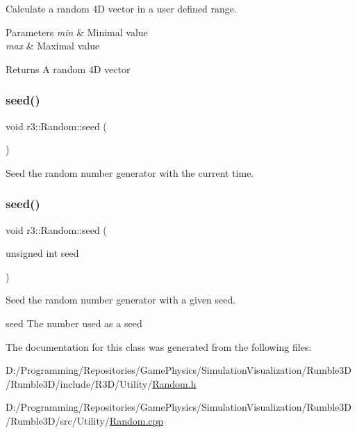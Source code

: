 Calculate a random 4D vector in a user defined range. 


\begin{DoxyParams}{Parameters}
{\em min} & Minimal value \\
\hline
{\em max} & Maximal value \\
\hline
\end{DoxyParams}
\begin{DoxyReturn}{Returns}
A random 4D vector 
\end{DoxyReturn}
\mbox{\label{classr3_1_1_random_afa6a47432ea2058f6424618bf77494f2}} 
\subsubsection{\texorpdfstring{seed()}{seed()}\hspace{0.1cm}{\footnotesize\ttfamily [1/2]}}
{\footnotesize\ttfamily void r3\+::\+Random\+::seed (\begin{DoxyParamCaption}{ }\end{DoxyParamCaption})\hspace{0.3cm}{\ttfamily [static]}}



Seed the random number generator with the current time. 

\mbox{\label{classr3_1_1_random_a5fbe1e0d20952af9374f024a24735d80}} 
\subsubsection{\texorpdfstring{seed()}{seed()}\hspace{0.1cm}{\footnotesize\ttfamily [2/2]}}
{\footnotesize\ttfamily void r3\+::\+Random\+::seed (\begin{DoxyParamCaption}\item[{unsigned int}]{seed }\end{DoxyParamCaption})\hspace{0.3cm}{\ttfamily [static]}}



Seed the random number generator with a given seed. 

seed The number used as a seed 

The documentation for this class was generated from the following files\+:\begin{DoxyCompactItemize}
\item 
D\+:/\+Programming/\+Repositories/\+Game\+Physics/\+Simulation\+Visualization/\+Rumble3\+D/\+Rumble3\+D/include/\+R3\+D/\+Utility/\mbox{\hyperlink{_random_8h}{Random.\+h}}\item 
D\+:/\+Programming/\+Repositories/\+Game\+Physics/\+Simulation\+Visualization/\+Rumble3\+D/\+Rumble3\+D/src/\+Utility/\mbox{\hyperlink{_random_8cpp}{Random.\+cpp}}\end{DoxyCompactItemize}
